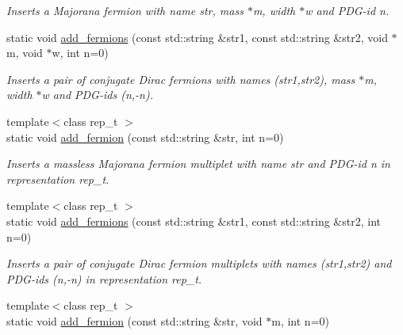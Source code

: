 \begin{DoxyCompactItemize}
\begin{DoxyCompactList}\small\item\em Inserts a Majorana fermion with name str, mass $\ast$m, width $\ast$w and P\+D\+G-\/id n. \end{DoxyCompactList}\item 
\hypertarget{a00372_a46eb14a53499f20bfbea625b01bbde92}{}static void \hyperlink{a00372_a46eb14a53499f20bfbea625b01bbde92}{add\+\_\+fermions} (const std\+::string \&str1, const std\+::string \&str2, void $\ast$m, void $\ast$w, int n=0)\label{a00372_a46eb14a53499f20bfbea625b01bbde92}

\begin{DoxyCompactList}\small\item\em Inserts a pair of conjugate Dirac fermions with names (str1,str2), mass $\ast$m, width $\ast$w and P\+D\+G-\/ids (n,-\/n). \end{DoxyCompactList}\item 
\hypertarget{a00372_a35659103225313895bab57fd0a1a5c89}{}{\footnotesize template$<$class rep\+\_\+t $>$ }\\static void \hyperlink{a00372_a35659103225313895bab57fd0a1a5c89}{add\+\_\+fermion} (const std\+::string \&str, int n=0)\label{a00372_a35659103225313895bab57fd0a1a5c89}

\begin{DoxyCompactList}\small\item\em Inserts a massless Majorana fermion multiplet with name str and P\+D\+G-\/id n in representation rep\+\_\+t. \end{DoxyCompactList}\item 
\hypertarget{a00372_ab3c53963beb700633bed6da348a4bbde}{}{\footnotesize template$<$class rep\+\_\+t $>$ }\\static void \hyperlink{a00372_ab3c53963beb700633bed6da348a4bbde}{add\+\_\+fermions} (const std\+::string \&str1, const std\+::string \&str2, int n=0)\label{a00372_ab3c53963beb700633bed6da348a4bbde}

\begin{DoxyCompactList}\small\item\em Inserts a pair of conjugate Dirac fermion multiplets with names (str1,str2) and P\+D\+G-\/ids (n,-\/n) in representation rep\+\_\+t. \end{DoxyCompactList}\item 
\hypertarget{a00372_a8802b9975deec1990fdc52555484f001}{}{\footnotesize template$<$class rep\+\_\+t $>$ }\\static void \hyperlink{a00372_a8802b9975deec1990fdc52555484f001}{add\+\_\+fermion} (const std\+::string \&str, void $\ast$m, int n=0)\label{a00372_a8802b9975deec1990fdc52555484f001}


\end{DoxyCompactItemize}
